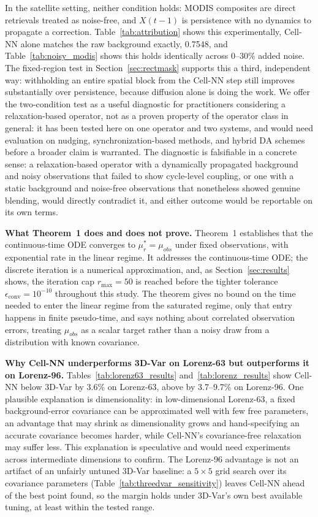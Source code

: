 \documentclass[final,5p,times,twocolumn,authoryear]{elsarticle}
\begin{document}
In the satellite setting, neither condition holds: MODIS composites
are direct retrievals treated as noise-free, and $X(t-1)$ is
persistence with no dynamics to propagate a correction. Table~\ref{tab:attribution}
shows this experimentally, Cell-NN alone matches the raw background
exactly, 0.7548, and Table~\ref{tab:noisy_modis} shows this holds
identically across 0--30\% added noise. The fixed-region test in
Section~\ref{sec:rectmask} supports this a third, independent way:
withholding an entire spatial block from the Cell-NN step still
improves substantially over persistence, because diffusion alone is
doing the work. We offer the two-condition test as a useful
diagnostic for practitioners considering a relaxation-based operator,
not as a proven property of the operator class in general: it has
been tested here on one operator and two systems, and would need
evaluation on nudging, synchronization-based methods, and hybrid DA
schemes before a broader claim is warranted. The diagnostic is
falsifiable in a concrete sense: a relaxation-based operator with a
dynamically propagated background and noisy observations that failed
to show cycle-level coupling, or one with a static background and
noise-free observations that nonetheless showed genuine blending,
would directly contradict it, and either outcome would be reportable
on its own terms.

\textbf{What Theorem~1 does and does not prove.} Theorem~1
establishes that the continuous-time ODE converges to $\mu_r^\ast =
\mu_{obs}$ under fixed observations, with exponential rate in the
linear regime. It addresses the continuous-time ODE; the discrete
iteration is a numerical approximation, and, as
Section~\ref{sec:results} shows, the iteration cap $r_\text{max}=50$
is reached before the tighter tolerance $\epsilon_\text{conv}=10^{-10}$
throughout this study. The theorem gives no bound on the time needed
to enter the linear regime from the saturated regime, only that entry
happens in finite pseudo-time, and says nothing about correlated
observation errors, treating $\mu_{obs}$ as a scalar target rather
than a noisy draw from a distribution with known covariance.

\textbf{Why Cell-NN underperforms 3D-Var on Lorenz-63 but outperforms
it on Lorenz-96.} Tables~\ref{tab:lorenz63_results}
and~\ref{tab:lorenz_results} show Cell-NN below
3D-Var by 3.6\% on Lorenz-63, above by 3.7--9.7\% on Lorenz-96. One
plausible explanation is dimensionality: in low-dimensional
Lorenz-63, a fixed background-error covariance can be approximated
well with few free parameters, an advantage that may shrink as
dimensionality grows and hand-specifying an accurate covariance
becomes harder, while Cell-NN's covariance-free relaxation may suffer
less. This explanation is speculative and would need experiments
across intermediate dimensions to confirm. The Lorenz-96 advantage
is not an artifact of an unfairly untuned 3D-Var baseline: a
$5\times5$ grid search over its covariance parameters
(Table~\ref{tab:threedvar_sensitivity}) leaves Cell-NN ahead of the
best point found, so the margin holds under 3D-Var's own best
available tuning, at least within the tested range.
\end{document}
